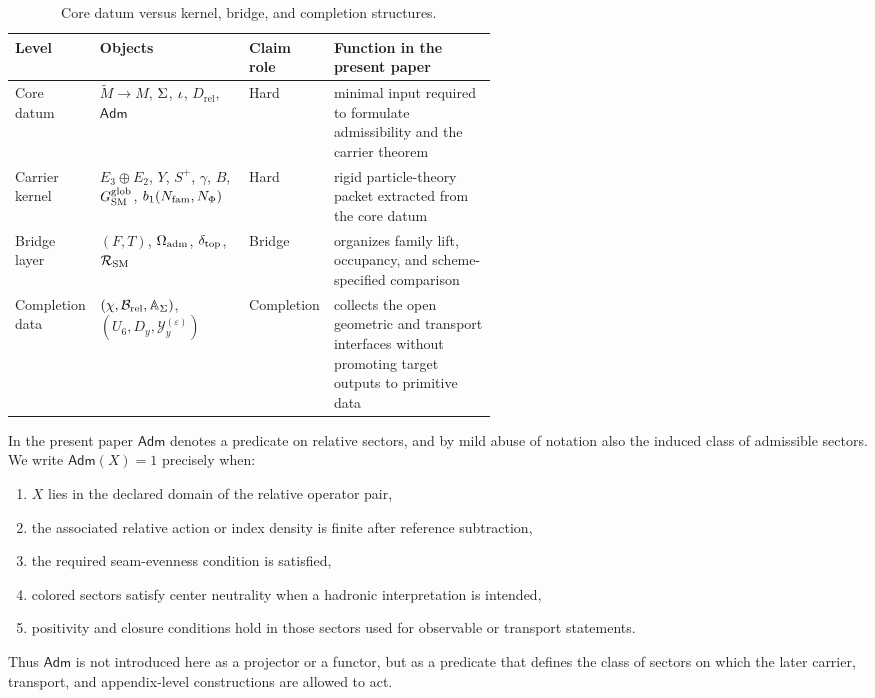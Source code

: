 \begin{table}[t]
\centering
\small
\begin{tabularx}{\linewidth}{@{}>{\raggedright\arraybackslash}p{0.12\linewidth}>{\raggedright\arraybackslash}p{0.31\linewidth}>{\raggedright\arraybackslash}p{0.13\linewidth}Y@{}}
\toprule
Level & Objects & Claim role & Function in the present paper \\
\midrule
Core datum & $\widetilde M\to M$, $\Sigma$, $\iota$, $D_{\mathrm{rel}}$, $\mathsf{Adm}$ & Hard & minimal input required to formulate admissibility and the carrier theorem \\
Carrier kernel & $E_3\oplus E_2$, $Y$, $S^+$, $\gamma$, $B$, $G_{\mathrm{SM}}^{\mathrm{glob}}$, $b_1(N_{\mathrm{fam}},N_\Phi)$ & Hard & rigid particle-theory packet extracted from the core datum \\
Bridge layer & $(F,T)$, $\Omega_{\mathrm{adm}}$, $\delta_{\mathrm{top}}$, $\mathcal R_{\mathrm{SM}}$ & Bridge & organizes family lift, occupancy, and scheme-specified comparison \\
Completion data & $(\chi,\mathcal B_{\mathrm{rel}},\mathbb A_{\Sigma})$, $(U_6,D_y,\mathcal Y_y^{(\varepsilon)})$ & Completion & collects the open geometric and transport interfaces without promoting target outputs to primitive data \\
\bottomrule
\end{tabularx}
\caption{Core datum versus kernel, bridge, and completion structures.}
\label{tab:layered-datum}
\end{table}

\begin{definition}
In the present paper $\mathsf{Adm}$ denotes a predicate on relative sectors, and by mild abuse of notation also the induced class of admissible sectors. We write $\mathsf{Adm}(X)=1$ precisely when:
\begin{enumerate}[label=(\arabic*), leftmargin=1.5em, topsep=3pt, itemsep=2pt]
    \item $X$ lies in the declared domain of the relative operator pair,
    \item the associated relative action or index density is finite after reference subtraction,
    \item the required seam-evenness condition is satisfied,
    \item colored sectors satisfy center neutrality when a hadronic interpretation is intended,
    \item positivity and closure conditions hold in those sectors used for observable or transport statements.
\end{enumerate}
Thus $\mathsf{Adm}$ is not introduced here as a projector or a functor, but as a predicate that defines the class of sectors on which the later carrier, transport, and appendix-level constructions are allowed to act.
\end{definition}

